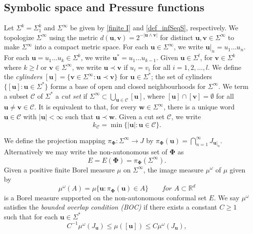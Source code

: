 \documentclass[12pt]{amsart}
\theoremstyle{plain}
\theoremstyle{definition}
\theoremstyle{remark}
\newcommand{\bu}{\mathbf{u}}
\newcommand{\bv}{\mathbf{v}}
\begin{document}
\subsection{Symbolic space and Pressure functions}
Let $\Sigma^{k}=\Sigma_1^{k}$ and $\Sigma^\infty$ be given by \eqref{finite I} and \eqref{def_infSeqS}, respectively.
We  topologize $\Sigma^\infty$ using the metric
$d(\mathbf{u},\mathbf{v})=2^{-|\mathbf{u}\wedge  \mathbf{v}|}$ for distinct $\mathbf{u},\mathbf{v} \in \Sigma^\infty$ to make $\Sigma^\infty$ into a compact metric space. For each $\bu \in\Sigma^\infty$, we write $\bu|_n=u_1\ldots u_n$.  For each $\mathbf{u}=u_1 \dots u_k \in \Sigma^k$, we write $\mathbf{u}^* =u_1 \dots u_{k-1}$.  Given $\mathbf{u}\in \Sigma^l$, for $\mathbf{v}\in \Sigma^k$ where $k\geq l$ or $\mathbf{v}\in\Sigma^\infty $,  we write $\mathbf{u}\prec \mathbf{v}$ if $u_i =v_i$ for all $i=1,2,\ldots, l$.  We define the \textit{cylinders} $[\bu]=\{\mathbf{v}\in \Sigma^\infty : \mathbf{u}\prec \mathbf{v}\}$ for $\mathbf{u}\in \Sigma^*$; the set of cylinders $\{[\bu] : \mathbf{u} \in \Sigma^* \}$ forms a base of open and closed neighbourhoods for $\Sigma^\infty$. We term a subset $\mathcal{C}$ of $\Sigma^*$ a
\textit{cut set} if $\Sigma^\infty\subset\bigcup_{\mathbf{u}\in \mathcal{C}}[\bu]$, where $[\bu]\cap[\bv]=\emptyset$ for  all $\mathbf{u}\neq \mathbf{v}\in \mathcal{C}$. It is equivalent to that, for every $\mathbf{w}\in \Sigma^\infty$, there is a unique word $\mathbf{u}\in \mathcal{C}$ with $|\mathbf{u}|<\infty$ such that $\mathbf{u}\prec \mathbf{w}$. Given a cut set $\mathcal{C}$, we write 
$$
k_{\mathcal{C} }=\min\{|\mathbf{u}|:\mathbf{u}\in\mathcal{C}\}.
$$


We define the projection mapping $\pi_{\boldsymbol{\Phi}}:\Sigma^\infty\to J$ by $ \pi_{\boldsymbol{\Phi}}(\mathbf{u})=\bigcap_{n=1}^\infty J_{\mathbf{u}|_n}.$ 
Alternatively we may write the non-autonomous set of $\boldsymbol{\Phi}$ as
\begin{equation}\label{att_1}
E=E(\boldsymbol{\Phi})=\pi_{\boldsymbol{\Phi}}(\Sigma^\infty).
\end{equation}
Given a positive finite Borel measure $\mu$ on $\Sigma^\infty$, the image measure  $\mu^\omega$  of $\mu$ given by
\begin{equation}\label{mu}
\mu^\omega(A)=\mu\{\mathbf{u}:\pi_{\boldsymbol{\Phi}}(\mathbf{u})\in A\}\qquad  \textit{for $A\subset \mathbb{R}^d$}
\end{equation}
is a Borel measure supported on the non-autonomous conformal set $E$. We say $\mu^\omega$ satisfies the \emph{bounded overlap condition (BOC)} if there exists a constant $C\ge 1$ such that for each $\bu\in\Sigma^*$
\begin{equation}\label{condition ssc}
C^{-1}\mu^\omega(J_\bu)\le\mu([\bu])\le C\mu^\omega(J_\bu),
\end{equation}
\end{document}
